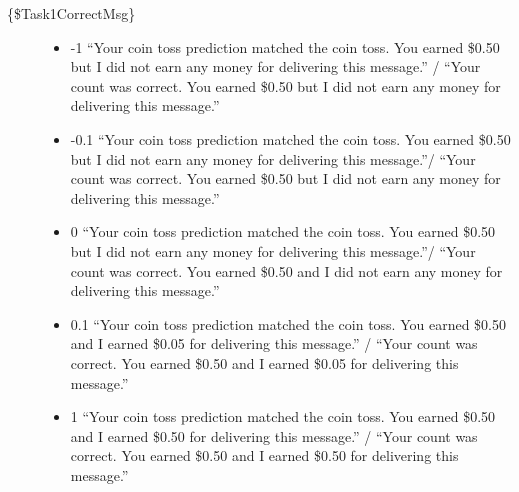 \begin{description}
\item[\{\$Task1CorrectMsg\}] \hspace{1cm}
\begin{itemize}
\item -1 ``Your coin toss prediction matched the coin toss. You earned \$0.50 but I
did not earn any money for delivering this message.'' / ``Your count was correct.
You earned \$0.50 but I did not earn any money for delivering this message.''

\item -0.1 ``Your coin toss prediction matched the coin toss. You earned \$0.50 but I
did not earn any money for delivering this message.''/ ``Your count was correct.
You earned \$0.50 but I did not earn any money for delivering this message.''

\item 0 ``Your coin toss prediction matched the coin toss. You earned \$0.50 but I did
not earn any money for delivering this message.''/ ``Your count was correct. You
earned \$0.50 and I did not earn any money for delivering this message.''

\item 0.1 ``Your coin toss prediction matched the coin toss. You earned \$0.50 and I
earned \$0.05 for delivering this message.'' / ``Your count was correct. You
earned \$0.50 and I earned \$0.05 for delivering this message.''

\item 1 ``Your coin toss prediction matched the coin toss. You earned \$0.50 and I
earned \$0.50 for delivering this message.'' / ``Your count was correct. You
earned \$0.50 and I earned \$0.50 for delivering this message.''
\end{itemize}
\end{description}

